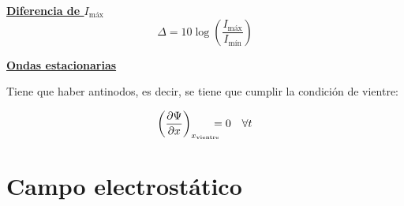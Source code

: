 \documentclass[a4paper]{book}
\numberwithin{figure}{chapter}
\numberwithin{equation}{chapter}
\newcommand{\formula}[1]{\vspace{13 pt}\noindent \textbf{\underline{#1}}}
\begin{document}
\begin{fleqn}
\begin{multicols}{2}
		\formula{Diferencia de $I_{\text{máx}}$}
		\[\Delta = 10 \log{\left( \frac{I_{\text{máx}}}{I_{\text{mín}}} \right)}\]

		\formula{Ondas estacionarias}
		\vspace{5pt}

		\noindent Tiene que haber antinodos, es decir, se tiene que cumplir la condición de vientre:

		\[\left( \pdv{\Psi}{x} \right)_{x_{\text{vientre}}}\! \! \! \! \! =0\quad \forall t\]

	\end{multicols}
\end{fleqn}

\newpage
\section{Campo electrostático}
\end{document}
